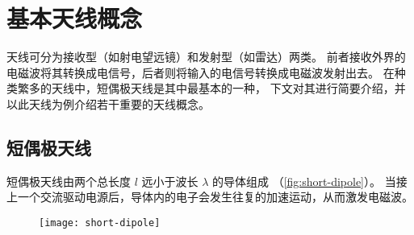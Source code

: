 \section{基本天线概念}
\label{sec:antenna}

天线可分为接收型（如射电望远镜）和发射型（如雷达）两类。
前者接收外界的电磁波将其转换成电信号，后者则将输入的电信号转换成电磁波发射出去。
在种类繁多的天线中，短偶极天线是其中最基本的一种，
下文对其进行简要介绍，并以此天线为例介绍若干重要的天线概念。

\subsection{短偶极天线}

短偶极天线由两个总长度 $l$ 远小于波长 $\lambda$ 的导体组成
（\autoref{fig:short-dipole}）。
当接上一个交流驱动电源后，导体内的电子会发生往复的加速运动，从而激发电磁波。

\begin{figure}[htp]
  \centering
  \texttt{[image: short-dipole]}
  \label{fig:short-dipole}
\end{figure}

